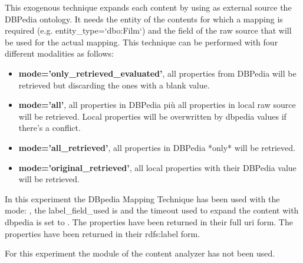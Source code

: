 \documentclass[11pt]{article}
\begin{document}
This exogenous technique expands each content by using as external source the DBPedia ontology.
It needs the entity of the contents for which a mapping is required (e.g. entity\_type=`dbo:Film`)
and the field of the raw source that will be used for the actual mapping.
This technique can be performed with four different modalities as follows:
\begin{itemize}
 \item
       \textbf{mode='only\_retrieved\_evaluated'}, all properties from DBPedia will be retrieved but discarding the
        ones with a blank value.
 \item
       \textbf{mode='all'}, all properties in DBPedia più all properties in local raw source will be retrieved.
        Local properties will be overwritten by dbpedia values if there's a conflict.
 \item
       \textbf{mode='all\_retrieved'}, all properties in DBPedia *only* will be retrieved.
 \item
       \textbf{mode='original\_retrieved'}, all local properties with their DBPedia value will be retrieved.
\end{itemize}
\hfill\break
\hfill\break
In this experiment the DBpedia Mapping Technique has been used with the mode:
, the label_field_used is
 and the timeout used
to expand the content with dbpedia is set to
.
The properties have been returned in their full uri form.
The properties have been returned in their rdfs:label form.
\hfill\break
\hfill\break
{}

For this experiment the module of the content analyzer has not been used.
\hfill\break
\hfill\break
\end{document}
